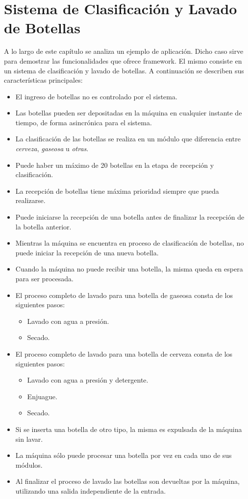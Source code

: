 \section {Sistema de Clasificación y Lavado de Botellas}
A lo largo de este capítulo se analiza un ejemplo de aplicación.
Dicho caso sirve para demostrar las funcionalidades que ofrece \nombreFramework
framework. El mismo consiste en un sistema de clasificación y lavado de
botellas.
A continuación se describen sus características principales:

\begin{itemize}
  \item El ingreso de botellas no es controlado por el sistema.
  \item Las botellas pueden ser depositadas en la máquina en cualquier instante
  de tiempo, de forma asincrónica para el sistema.
  \item La clasificación de las botellas se realiza en un módulo que
  diferencia entre \emph{cerveza}, \emph{gaseosa} u \emph{otras}.
  \item Puede haber un máximo de 20 botellas en la etapa de
  recepción y clasificación.
  \item La recepción de botellas tiene máxima prioridad siempre que pueda
  realizarse.
  \item Puede iniciarse la recepción de una botella antes de finalizar
  la recepción de la botella anterior.
  \item Mientras la máquina se encuentra en proceso de clasificación de
  botellas, no puede iniciar la recepción de una nueva botella.
  \item Cuando la máquina no puede recibir una botella, la misma queda en espera
  para ser procesada.
  \item El proceso completo de lavado para una botella de gaseosa consta de los
  siguientes pasos:
      \begin{itemize} 
        \item Lavado con agua a presión.
        \item Secado.
      \end{itemize}
  \item El proceso completo de lavado para una botella de cerveza consta de los
  siguientes pasos:
      \begin{itemize} 
        \item Lavado con agua a presión y detergente.
        \item Enjuague.
        \item Secado.
      \end{itemize}
  \item Si se inserta una botella de otro tipo, la misma es expulsada de la
    máquina sin lavar.
  \item La máquina sólo puede procesar una botella por vez en cada uno de sus
  módulos.
  \item Al finalizar el proceso de lavado las botellas son devueltas por la
  máquina, utilizando una salida independiente de la entrada.
  
\end{itemize}

